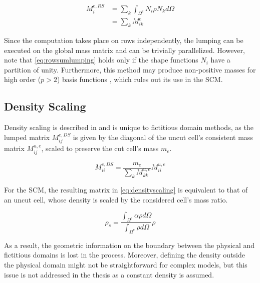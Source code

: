 \begin{equation} \label{eq:rowsumlumping}
	\begin{array}{rl}
	M_{i}^{e,RS}
	
	&= \sum_k \int_{\Omega^e} N_i \rho N_k d\Omega \\[0.5em]
	&= \sum_k M_{ik}^e
		
	\end{array}
\end{equation}

Since the computation takes place on rows independently, the lumping can be executed
on the global mass matrix and can be trivially parallelized. However, note that
\ref{eq:rowsumlumping} holds only if the shape functions $N_i$ have a partition
of unity. Furthermore, this method may produce non-positive masses for high order ($p>2$)
basis functions \cite{Duczek2014}, which rules out its use in the SCM.

%
\subsection{Density Scaling}
\label{subsection:density_scaling_lumping}
%

Density scaling is described in \cite{Joulaian2014} and is unique to fictitious
domain methods, as the lumped matrix $M_{ij}^{e,DS}$ is given by the diagonal of the uncut cell's
consistent mass matrix $M_{ij}^{u,e}$, scaled to preserve the cut cell's mass $m_e$.

\begin{equation} \label{eq:densityscaling}
	M_{ii}^{e,DS} =
		\frac{m_e}{\sum_k M_{kk}^{u,e}} M_{ii}^{u,e}
\end{equation}

For the SCM, the resulting matrix in \ref{eq:densityscaling} is equivalent
to that of an uncut cell, whose density is scaled by the considered cell's mass ratio.

\begin{equation} \label{eq:scaleddensity}
	\rho_s = \frac{\int_{\Omega^e} \alpha \rho d\Omega}{\int_{\Omega^e} \rho d\Omega} \rho
\end{equation}

As a result, the geometric information on the boundary between the physical
and fictitious domains is lost in the process. Moreover, defining the density
outside the physical domain might not be straightforward for complex models, but
this issue is not addressed in the thesis as a constant density is assumed.

